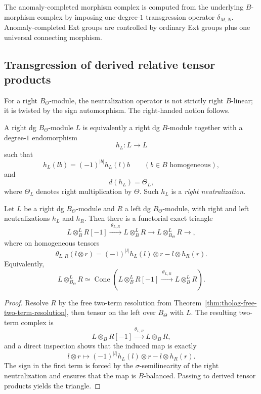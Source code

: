 \begin{remark}
\label{rem:tholog-hom-philosophy}
The anomaly-completed morphism complex is computed from the underlying \(B\)-morphism complex by imposing one degree-\(1\) transgression operator \(\delta_{M,N}\).
Anomaly-completed Ext groups are controlled by ordinary Ext groups plus one universal connecting morphism.
\end{remark}

\subsection{Transgression of derived relative tensor products}
\label{subsec:tholog-derived-tensors}

For a right \(B_{\Theta}\)-module, the neutralization operator is not strictly right \(B\)-linear; it is twisted by the sign automorphism. The right-handed notion follows.

\begin{definition}
\label{def:tholog-right-neutralization}
A right dg \(B_{\Theta}\)-module \(L\) is equivalently a right dg \(B\)-module together with a degree-\(1\) endomorphism
\[
h_{L}:L\longrightarrow L
\]
such that
\[
h_{L}(lb)=(-1)^{|b|}h_{L}(l)b
\qquad (b\in B \text{ homogeneous}),
\]
and
\[
d(h_{L})=\Theta_{L},
\]
where \(\Theta_{L}\) denotes right multiplication by \(\Theta\).
Such \(h_{L}\) is a \emph{right neutralization}.
\end{definition}

\begin{theorem}
\label{thm:tholog-derived-tensor}
Let \(L\) be a right dg \(B_{\Theta}\)-module and \(R\) a left dg \(B_{\Theta}\)-module, with right and left neutralizations \(h_{L}\) and \(h_{R}\).
Then there is a functorial exact triangle
\[
L\otimes^{L}_{B}R[-1]
\xrightarrow{\;\theta_{L,R}\;}
L\otimes^{L}_{B}R
\longrightarrow
L\otimes^{L}_{B_{\Theta}}R
\longrightarrow ,
\]
where on homogeneous tensors
\[
\theta_{L,R}(l\otimes r)
=
(-1)^{|l|}h_{L}(l)\otimes r-l\otimes h_{R}(r).
\]
Equivalently,
\[
L\otimes^{L}_{B_{\Theta}}R
\simeq
\operatorname{Cone}\!\left(
L\otimes^{L}_{B}R[-1]
\xrightarrow{\;\theta_{L,R}\;}
L\otimes^{L}_{B}R
\right).
\]
\end{theorem}

\begin{proof}
Resolve \(R\) by the free two-term resolution from Theorem~\ref{thm:tholog-free-two-term-resolution}, then tensor on the left over \(B_{\Theta}\) with \(L\).
The resulting two-term complex is
\[
L\otimes_{B}R[-1]\xrightarrow{\theta_{L,R}}L\otimes_{B}R,
\]
and a direct inspection shows that the induced map is exactly
\[
l\otimes r\longmapsto (-1)^{|l|}h_{L}(l)\otimes r-l\otimes h_{R}(r).
\]
The sign in the first term is forced by the \(\sigma\)-semilinearity of the right neutralization and ensures that the map is \(B\)-balanced.
Passing to derived tensor products yields the triangle.
\end{proof}

